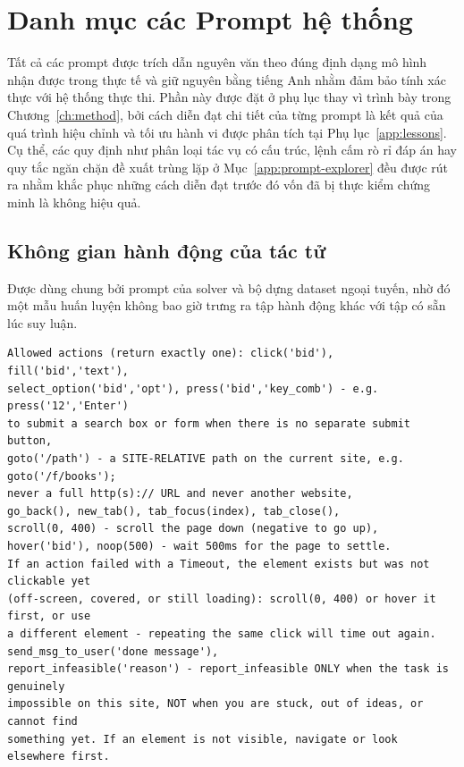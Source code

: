 \chapter{Danh mục các Prompt hệ thống}
\label{app:prompts}

Tất cả các prompt được trích dẫn nguyên văn theo đúng định dạng mô hình nhận được trong thực tế và giữ nguyên bằng tiếng Anh nhằm đảm bảo tính xác thực với hệ thống thực thi. Phần này được đặt ở phụ lục thay vì trình bày trong Chương~\ref{ch:method}, bởi cách diễn đạt chi tiết của từng prompt là kết quả của quá trình hiệu chỉnh và tối ưu hành vi được phân tích tại Phụ lục~\ref{app:lessons}. Cụ thể, các quy định như phân loại tác vụ có cấu trúc, lệnh cấm rò rỉ đáp án hay quy tắc ngăn chặn đề xuất trùng lặp ở Mục~\ref{app:prompt-explorer} đều được rút ra nhằm khắc phục những cách diễn đạt trước đó vốn đã bị thực kiểm chứng minh là không hiệu quả.

\section{Không gian hành động của tác tử}
\label{app:prompt-actions}

Được dùng chung bởi prompt của solver và bộ dựng dataset ngoại tuyến, nhờ đó
một mẫu huấn luyện không bao giờ trưng ra tập hành động khác với tập có sẵn lúc
suy luận.

\begin{lstlisting}[style=mystyle,numbers=none,basicstyle=\scriptsize\ttfamily]
Allowed actions (return exactly one): click('bid'), fill('bid','text'),
select_option('bid','opt'), press('bid','key_comb') - e.g. press('12','Enter')
to submit a search box or form when there is no separate submit button,
goto('/path') - a SITE-RELATIVE path on the current site, e.g. goto('/f/books');
never a full http(s):// URL and never another website,
go_back(), new_tab(), tab_focus(index), tab_close(),
scroll(0, 400) - scroll the page down (negative to go up),
hover('bid'), noop(500) - wait 500ms for the page to settle.
If an action failed with a Timeout, the element exists but was not clickable yet
(off-screen, covered, or still loading): scroll(0, 400) or hover it first, or use
a different element - repeating the same click will time out again.
send_msg_to_user('done message'),
report_infeasible('reason') - report_infeasible ONLY when the task is genuinely
impossible on this site, NOT when you are stuck, out of ideas, or cannot find
something yet. If an element is not visible, navigate or look elsewhere first.
\end{lstlisting}

